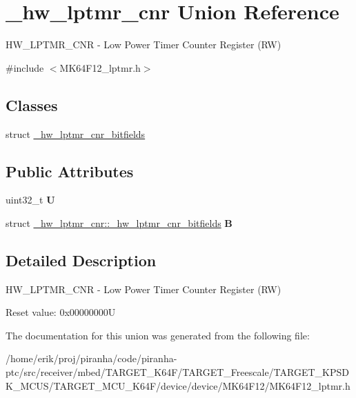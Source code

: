 \hypertarget{union__hw__lptmr__cnr}{}\section{\+\_\+hw\+\_\+lptmr\+\_\+cnr Union Reference}
\label{union__hw__lptmr__cnr}


H\+W\+\_\+\+L\+P\+T\+M\+R\+\_\+\+C\+NR -\/ Low Power Timer Counter Register (RW)  




{\ttfamily \#include $<$M\+K64\+F12\+\_\+lptmr.\+h$>$}

\subsection*{Classes}
\begin{DoxyCompactItemize}
\item 
struct \hyperlink{struct__hw__lptmr__cnr_1_1__hw__lptmr__cnr__bitfields}{\+\_\+hw\+\_\+lptmr\+\_\+cnr\+\_\+bitfields}
\end{DoxyCompactItemize}
\subsection*{Public Attributes}
\begin{DoxyCompactItemize}
\item 
uint32\+\_\+t {\bfseries U}\hypertarget{union__hw__lptmr__cnr_a0c30ccd61f575f18f4aa5845cfc0454d}{}\label{union__hw__lptmr__cnr_a0c30ccd61f575f18f4aa5845cfc0454d}

\item 
struct \hyperlink{struct__hw__lptmr__cnr_1_1__hw__lptmr__cnr__bitfields}{\+\_\+hw\+\_\+lptmr\+\_\+cnr\+::\+\_\+hw\+\_\+lptmr\+\_\+cnr\+\_\+bitfields} {\bfseries B}\hypertarget{union__hw__lptmr__cnr_a28fc6c7079689d4903ef15e66ae9e9c6}{}\label{union__hw__lptmr__cnr_a28fc6c7079689d4903ef15e66ae9e9c6}

\end{DoxyCompactItemize}


\subsection{Detailed Description}
H\+W\+\_\+\+L\+P\+T\+M\+R\+\_\+\+C\+NR -\/ Low Power Timer Counter Register (RW) 

Reset value\+: 0x00000000U 

The documentation for this union was generated from the following file\+:\begin{DoxyCompactItemize}
\item 
/home/erik/proj/piranha/code/piranha-\/ptc/src/receiver/mbed/\+T\+A\+R\+G\+E\+T\+\_\+\+K64\+F/\+T\+A\+R\+G\+E\+T\+\_\+\+Freescale/\+T\+A\+R\+G\+E\+T\+\_\+\+K\+P\+S\+D\+K\+\_\+\+M\+C\+U\+S/\+T\+A\+R\+G\+E\+T\+\_\+\+M\+C\+U\+\_\+\+K64\+F/device/device/\+M\+K64\+F12/M\+K64\+F12\+\_\+lptmr.\+h\end{DoxyCompactItemize}
